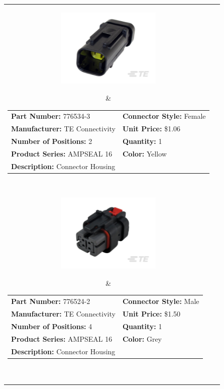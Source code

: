 \documentclass[12pt,letterpaper]{article}
\begin{document}
\begin{longtable}{c l}
\parbox[c]{5cm}{\includegraphics[width=5cm]{776534-3.png} }
& \begin{tabular}{l l}
\textbf{Part Number:} 776534-3 & \textbf{Connector Style:} Female \\
\textbf{Manufacturer:} TE Connectivity & \textbf{Unit Price:} \$1.06 \\
\textbf{Number of Positions:} 2 & \textbf{Quantity:} 1 \\
\textbf{Product Series:} AMPSEAL 16 & \textbf{Color:} Yellow \\
\multicolumn{2}{p{8cm}}{\textbf{Description:} Connector Housing } \\
\end{tabular} \\

\parbox[c]{5cm}{\includegraphics[width=5cm]{776524-2.png} }
& \begin{tabular}{l l}
\textbf{Part Number:} 776524-2 & \textbf{Connector Style:} Male \\
\textbf{Manufacturer:} TE Connectivity & \textbf{Unit Price:} \$1.50 \\
\textbf{Number of Positions:} 4 & \textbf{Quantity:} 1 \\
\textbf{Product Series:} AMPSEAL 16 & \textbf{Color:} Grey \\
\multicolumn{2}{p{8cm}}{\textbf{Description:} Connector Housing } \\
\end{tabular} \\


\end{longtable}
\end{document}
